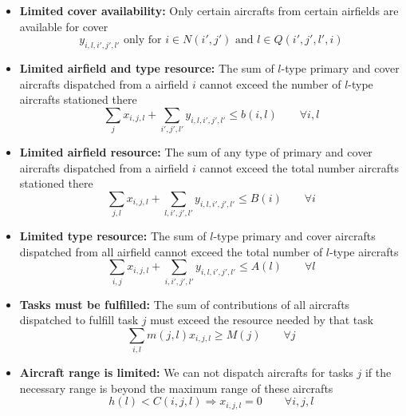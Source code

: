 \documentclass{article}
\begin{document}
\begin{itemize}
\item 
\textbf{Limited cover availability:}
Only certain aircrafts from certain airfields are available for cover
\begin{equation} \label{eqn:constraint_cover_availability}
    y_{i, l, i', j', l'} \text{ only for } i \in N(i', j') \text{ and } l \in Q(i', j', l', i)
\end{equation}

\item
\textbf{Limited airfield and type resource:}
The sum of $l$-type primary and cover aircrafts dispatched from a airfield $i$ cannot exceed the number of $l$-type aircrafts stationed there
\begin{equation} \label{eqn:constraint_airfield_type_resource}
    \sum_j x_{i, j, l} + \sum_{i', j', l'}  y_{i, l, i', j', l'} \leq b(i, l) \qquad  \forall i, l 
\end{equation}

\item
\textbf{Limited airfield resource:}
The sum of any type of primary and cover aircrafts dispatched from a airfield $i$ cannot exceed the total number aircrafts stationed there
\begin{equation} \label{eqn:constraint_airfield_total_resource}
    \sum_{j, l} x_{i,j,l} + \sum_{l, i', j', l'} y_{i, l, i', j', l'} \leq B(i) \qquad \forall i
\end{equation}

\item
\textbf{Limited type resource:}
The sum of $l$-type primary and cover aircrafts dispatched from all airfield cannot exceed the total number of $l$-type aircrafts
\begin{equation} \label{eqn:constraint_type_total_resource}
    \sum_{i, j} x_{i, j, l} + \sum_{i, i', j', l'} y_{i, l, i', j', l'} \leq A(l) \qquad \forall l
\end{equation}

\item
\textbf{Tasks must be fulfilled:}
The sum of contributions of all aircrafts dispatched to fulfill task $j$ must exceed the resource needed by that task
\begin{equation} \label{eqn:constraint_task_fulfilled}
    \sum_{i, l} m(j, l) x_{i, j, l} \geq M(j)  \qquad \forall j
\end{equation}

\item
\textbf{Aircraft range is limited:}
We can not dispatch aircrafts for tasks $j$ if the necessary range is beyond the maximum range of these aircrafts
\begin{equation} \label{eqn:constraint_range}
    h(l) < C(i, j, l) \Rightarrow x_{i, j, l} = 0 \qquad \forall i, j, l 
\end{equation}


\end{itemize}
\end{document}
